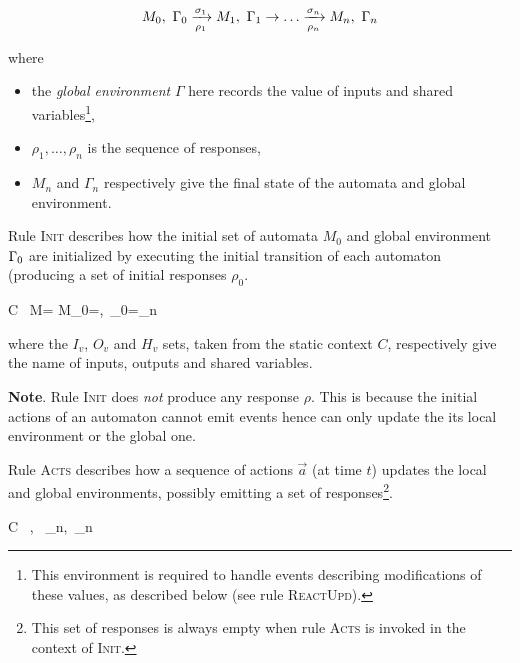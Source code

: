 \begin{eqnarray*}
  M_0,\ \Gamma_0 \xrightarrow[\rho_1]{\sigma_1} M_1,\ \Gamma_1 \rightarrow \ldots
  \xrightarrow[\rho_n]{\sigma_n} M_n,\ \Gamma_n
\end{eqnarray*}

\noindent where
\begin{itemize}
\item the \emph{global environment} $\Gamma$ here records the value of inputs and shared
  variables\footnote{This environment is required to handle events describing modifications of these
    values, as described below (see rule \textsc{ReactUpd}).},
\item $\rho_1, \ldots, \rho_n$ is the sequence of responses,
  \item $M_n$ and $\Gamma_n$ respectively give the final state of the automata and global
    environment.
\end{itemize}
  
\medskip \step
Rule \textsc{Init} describes how the initial set of automata $M_0$ and global environment
$\Gamma_0$ are initialized by executing the initial transition of each automaton (producing a set of
initial responses $\rho_0$. 

{C \vdash\ M=\setn{\mu} \xrightarrow{} M_0=,\ \env_0=\gamma_n}


\noindent
where the $I_v$, $O_v$ and $H_v$ sets, taken from the static context $C$, respectively give the name of
  inputs, outputs and shared variables.

\medskip
\textbf{Note}. Rule \textsc{Init} does \emph{not} produce any response
$\rho$. This is because the initial actions of an automaton cannot emit events hence can only update the
its local environment or the global one.

\medskip \step Rule \textsc{Acts} describes how a sequence of actions $\vec{a}$ (at time
$t$) updates the local and global environments, possibly emitting a set of responses\footnote{This
  set of responses is always empty when rule \textsc{Acts} is invoked in the context of \textsc{Init}.}.

{C \vdash\ \vars,\ \env {} \vars_n,\ \env_n}

